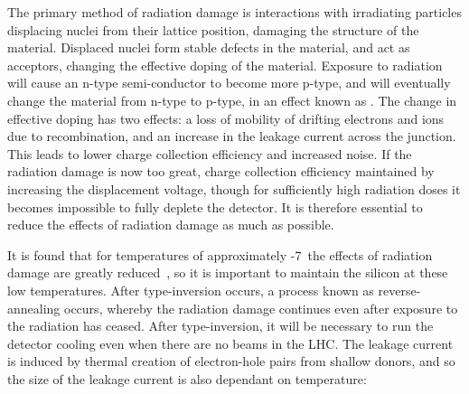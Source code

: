 The primary method
of radiation damage is interactions with irradiating particles displacing nuclei from
their lattice position, damaging the structure of the material. Displaced nuclei
form stable defects in the material, and act as acceptors, changing the
effective doping of the material. Exposure to radiation will cause an n-type
semi-conductor to become more p-type, and will eventually change the
material from n-type to p-type, in an effect known as .
The change in effective doping has two
effects: a loss of mobility of drifting electrons and ions due to recombination, and an increase in
the leakage current across the junction. This leads to lower charge collection
efficiency and increased noise. If the radiation damage is now too great, charge
collection efficiency maintained by increasing the displacement voltage, though for sufficiently high radiation doses it
becomes impossible to fully deplete the detector. It is therefore essential to
reduce the effects of radiation damage as much as possible.
 

It is found that for temperatures of approximately -7\dc\ the effects of
radiation damage are greatly reduced~\cite{Lindstrom2001308}, so it is important
to maintain the silicon at these low temperatures. After type-inversion occurs,
a process known as reverse-annealing occurs, whereby the radiation damage
continues even after exposure to the radiation has ceased. After type-inversion,
it will be necessary to run the detector cooling even when there are no beams in
the LHC.
The leakage current is induced by thermal creation of electron-hole pairs from
shallow donors, and so the size of the leakage current is also dependant on
temperature: 

